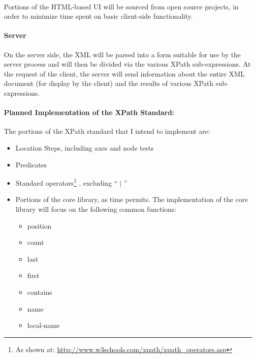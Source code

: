 \documentclass[12pt,letterpaper,final]{article}
\begin{document}
\paragraph{}
Portions of the HTML-based UI will be sourced from open source projects, in order to minimize time spent on basic client-side functionality.

\paragraph{Server}
On  the server side, the XML will be parsed into a form suitable for use by the server process and will then be divided via the various XPath sub-expressions.  At the request of the client, the server will send information about the entire XML document (for display by the client) and the results of various XPath sub-expressions.

\paragraph{Planned Implementation of the XPath Standard:}
The portions of the XPath standard that I intend to implement are:
\begin{itemize}
\item Location Steps, including axes and node tests
\item Predicates
\item Standard operators\protect\footnote{As shown at: \url{http://www.w3schools.com/xpath/xpath_operators.asp}} , excluding `` $|$ ''
\item Portions of the core library, as time permits.  The implementation of the core library will focus on the following common functions:
	\begin{itemize}
	\item position
	\item count
	\item last
	\item first
	\item contains
	\item name
	\item local-name
	\end{itemize}
\end{itemize}
\end{document}
